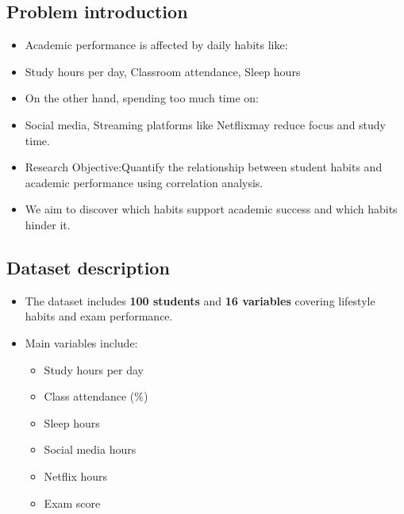 \documentclass[
  10pt,
  letterpaper,
  DIV=11,
  numbers=noendperiod]{scrartcl}
\begin{document}
\newpage

\subsection{Problem introduction}\label{problem-introduction}

\begin{itemize}
\item
  Academic performance is affected by daily habits like:
\item
  Study hours per day, Classroom attendance, Sleep hours
\item
  On the other hand, spending too much time on:
\item
  Social media, Streaming platforms like Netflixmay reduce focus and
  study time.
\item
  Research Objective:Quantify the relationship between student habits
  and academic performance using correlation analysis.
\item
  We aim to discover which habits support academic success and which
  habits hinder it.
\end{itemize}

\newpage

\subsection{Dataset description}\label{dataset-description}

\begin{itemize}
\item
  The dataset includes \textbf{100 students} and \textbf{16 variables}
  covering lifestyle habits and exam performance.
\item
  Main variables include:

  \begin{itemize}
  \item
    Study hours per day
  \item
    Class attendance (\%)
  \item
    Sleep hours
  \item
    Social media hours
  \item
    Netflix hours
  \item
    Exam score
  \end{itemize}
\end{itemize}
\end{document}

